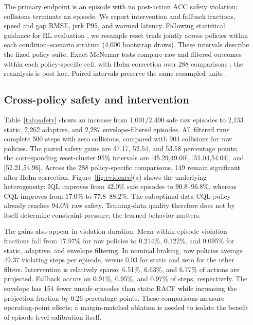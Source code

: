 The primary endpoint is an episode with no post-action ACC safety violation;
collisions terminate an episode. We report intervention and fallback
fractions, speed and gap RMSE, jerk P95, and warmed latency. Following
statistical guidance for RL evaluation \cite{agarwal2021precipice},
we resample reset trials jointly across policies within each
condition--scenario stratum (4,000 bootstrap draws). These intervals describe
the fixed policy suite. Exact McNemar tests \cite{mcnemar1947} compare
raw and filtered outcomes within each policy-specific cell, with Holm
correction over 288 comparisons \cite{holm1979}; the reanalysis is post hoc.
Paired intervals preserve the same resampled units \cite{efron1993}.

\begin{table}[t]
\caption{Episode-safe counts out of 600 per operating condition.
Coll. counts collisions across all 2,400 episodes per method.}
\label{tab:safety}
\centering
\setlength{\tabcolsep}{4pt}

\end{table}

\subsection{Cross-policy safety and intervention}
Table~\ref{tab:safety} shows an increase from 1,001/2,400 safe raw episodes
to 2,133 static, 2,262 adaptive, and 2,287 envelope-filtered episodes.
All filtered runs complete 500 steps with zero collisions, compared with
904 collisions for raw policies. The paired safety gains are 47.17,
52.54, and 53.58 percentage points; the corresponding reset-cluster 95\%
intervals are [45.29,49.00], [51.04,54.04], and [52.21,54.96].
Across the 288 policy-specific comparisons, 149 remain significant after
Holm correction. Figure~\ref{fig:evidence}(a) shows the underlying heterogeneity:
IQL improves from 42.0\% safe episodes to 90.8--96.8\%, whereas CQL
improves from 17.0\% to 77.8--88.2\%. The suboptimal-data CQL policy
already reaches 94.0\% raw safety. Training-data quality therefore does not
by itself determine constraint pressure; the learned behavior matters.

The gains also appear in violation duration. Mean within-episode violation
fractions fall from 17.97\% for raw policies to 0.214\%, 0.122\%, and
0.095\% for static, adaptive, and envelope filtering. In nominal braking,
raw policies average 49.37 violating steps per episode, versus 0.03 for
static and zero for the other filters. Intervention is relatively sparse:
6.51\%, 6.63\%, and 6.77\% of actions are projected. Fallback occurs
on 0.91\%, 0.95\%, and 0.97\% of steps, respectively.
The envelope has 154 fewer unsafe episodes than static RACF while increasing
the projection fraction by 0.26 percentage points. These comparisons
measure operating-point effects; a margin-matched ablation is needed to
isolate the benefit of episode-level calibration itself.

